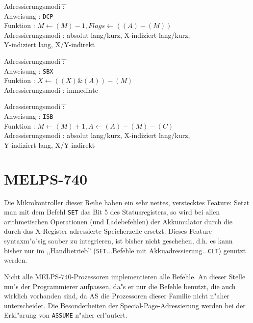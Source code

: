 \documentclass[12pt,a4paper,twoside]{report}
\newcommand{\tty}[1]{{\tt #1}}
\begin{document}
\begin{tabbing}
Adressierungsmodi \= : \= \kill \\
Anweisung         \> : \> \tty{DCP} \\
Funktion          \> : \> $M \leftarrow(M)-1, Flags\leftarrow((A)-(M))$ \\
Adressierungsmodi \> : \> absolut lang/kurz, X-indiziert lang/kurz, \\
                  \>   \> Y-indiziert lang, X/Y-indirekt \\
\end{tabbing}
\begin{tabbing}
Adressierungsmodi \= : \= \kill \\
Anweisung         \> : \> \tty{SBX} \\
Funktion          \> : \> $X\leftarrow((X)\&(A))-(M)$ \\
Adressierungsmodi \> : \> immediate \\
\end{tabbing}
\begin{tabbing}
Adressierungsmodi \= : \= \kill \\
Anweisung         \> : \> \tty{ISB} \\
Funktion          \> : \> $M\leftarrow(M)+1, A\leftarrow(A)-(M)-(C)$ \\
Adressierungsmodi \> : \> absolut lang/kurz, X-indiziert lang/kurz, \\
                  \>   \> Y-indiziert lang, X/Y-indirekt \\
\end{tabbing}


\section{MELPS-740}

Die Mikrokontroller dieser Reihe haben ein sehr nettes, verstecktes
Feature: Setzt man mit dem Befehl \tty{SET} das Bit 5 des
Statusregisters, so wird bei allen arithmetischen Operationen (und
Ladebefehlen) der Akkumulator durch die durch das X-Register adressierte
Speicherzelle ersetzt.  Dieses Feature syntaxm"a"sig sauber zu integrieren,
ist bisher nicht geschehen, d.h. es kann bisher nur im ,,Handbetrieb''
(\tty{SET}...Befehle mit Akkuadressierung...\tty{CLT}) genutzt werden.
\par
Nicht alle MELPS-740-Prozessoren implementieren alle Befehle.  An dieser
Stelle mu"s der Programmierer aufpassen, da"s er nur die Befehle benutzt,
die auch wirklich vorhanden sind, da AS die Prozessoren dieser Familie
nicht n"aher unterscheidet.  Die Besonderheiten der
Special-Page-Adressierung werden bei der Erkl"arung von \tty{ASSUME} n"aher
erl"autert.
\end{document}
